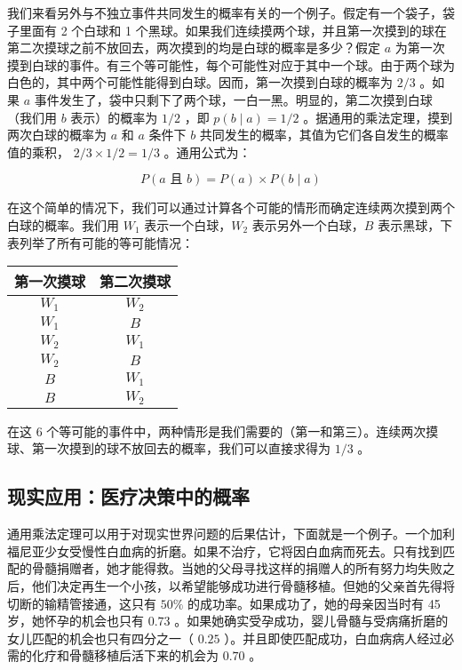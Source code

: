 我们来看另外与不独立事件共同发生的概率有关的一个例子。假定有一个袋子，袋子里面有 2 个白球和 1 个黑球。如果我们连续摸两个球，并且第一次摸到的球在第二次摸球之前不放回去，两次摸到的均是白球的概率是多少？假定 $a$ 为第一次摸到白球的事件。有三个等可能性，每个可能性对应于其中一个球。由于两个球为白色的，其中两个可能性能得到白球。因而，第一次摸到白球的概率为 $2 / 3$ 。如果 $a$ 事件发生了，袋中只剩下了两个球，一白一黑。明显的，第二次摸到白球（我们用 $b$ 表示）的概率为 $1 / 2$ ，即 $p(b \mid a)=1 / 2$ 。据通用的乘法定理，摸到两次白球的概率为 $a$ 和 $a$ 条件下 $b$ 共同发生的概率，其值为它们各自发生的概率值的乘积， $2 / 3 \times 1 / 2=1 / 3$ 。通用公式为：

$$
P(a \text { 且 } b)=P(a) \times P(b \mid a)
$$

在这个简单的情况下，我们可以通过计算各个可能的情形而确定连续两次摸到两个白球的概率。我们用 $W_{1}$ 表示一个白球，$W_{2}$ 表示另外一个白球，$B$ 表示黑球，下表列举了所有可能的等可能情况：

\begin{center}
\begin{tabular}{|c|c|}
\hline
\textbf{第一次摸球} & \textbf{第二次摸球} \\
\hline
$W_{1}$ & $W_{2}$ \\
$W_{1}$ & $B$ \\
$W_{2}$ & $W_{1}$ \\
$W_{2}$ & $B$ \\
$B$ & $W_{1}$ \\
$B$ & $W_{2}$ \\
\hline
\end{tabular}
\end{center}

在这 6 个等可能的事件中，两种情形是我们需要的（第一和第三）。连续两次摸球、第一次摸到的球不放回去的概率，我们可以直接求得为 $1 / 3$ 。

\subsection{现实应用：医疗决策中的概率}

通用乘法定理可以用于对现实世界问题的后果估计，下面就是一个例子。一个加利福尼亚少女受慢性白血病的折磨。如果不治疗，它将因白血病而死去。只有找到匹配的骨髓捐赠者，她才能得救。当她的父母寻找这样的捐赠人的所有努力均失败之后，他们决定再生一个小孩，以希望能够成功进行骨髓移植。但她的父亲首先得将切断的输精管接通，这只有 $50\%$ 的成功率。如果成功了，她的母亲因当时有 45 岁，她怀孕的机会也只有 $0.73$ 。如果她确实受孕成功，婴儿骨髓与受病痛折磨的女儿匹配的机会也只有四分之一（ $0.25$ ）。并且即使匹配成功，白血病病人经过必需的化疗和骨髓移植后活下来的机会为 $0.70$ 。

